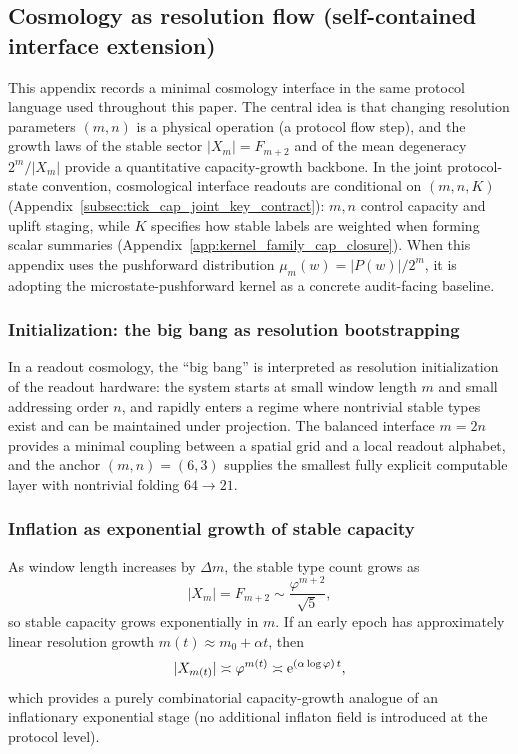 \subsection[Cosmology as resolution flow]{Cosmology as resolution flow (self-contained interface extension)}
\label{app:cosmology_resolution_flow}

This appendix records a minimal cosmology interface in the same protocol language used throughout this paper.
The central idea is that changing resolution parameters $(m,n)$ is a physical operation (a protocol flow step), and the growth laws of the stable sector $|X_m|=F_{m+2}$ and of the mean degeneracy $2^m/|X_m|$ provide a quantitative capacity-growth backbone.
\AuditTag In the joint protocol-state convention, cosmological interface readouts are conditional on $(m,n,K)$ (Appendix~\ref{subsec:tick_cap_joint_key_contract}): $m,n$ control capacity and uplift staging, while $K$ specifies how stable labels are weighted when forming scalar summaries (Appendix~\ref{app:kernel_family_cap_closure}).
When this appendix uses the pushforward distribution $\mu_m(w)=|P(w)|/2^m$, it is adopting the microstate-pushforward kernel as a concrete audit-facing baseline.

\subsubsection{Initialization: the big bang as resolution bootstrapping}
\label{subsec:cosmo_init}

\InterfaceTag In a readout cosmology, the ``big bang'' is interpreted as resolution initialization of the readout hardware:
the system starts at small window length $m$ and small addressing order $n$, and rapidly enters a regime where nontrivial stable types exist and can be maintained under projection.
The balanced interface $m=2n$ provides a minimal coupling between a spatial grid and a local readout alphabet, and the anchor $(m,n)=(6,3)$ supplies the smallest fully explicit computable layer with nontrivial folding $64\to 21$.

\subsubsection{Inflation as exponential growth of stable capacity}
\label{subsec:cosmo_inflation_capacity}

As window length increases by $\Delta m$, the stable type count grows as
\[
|X_m|=F_{m+2}\sim \frac{\varphi^{m+2}}{\sqrt{5}},
\]
so stable capacity grows exponentially in $m$.
If an early epoch has approximately linear resolution growth $m(t)\approx m_0+\alpha t$, then
\[
|X_{m(t)}|\asymp \varphi^{m(t)}\asymp \mathrm{e}^{(\alpha\log\varphi)\,t},
\]
which provides a purely combinatorial capacity-growth analogue of an inflationary exponential stage (no additional inflaton field is introduced at the protocol level).

